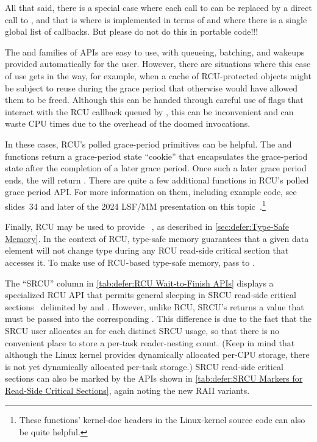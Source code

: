 {{	All that said, there is a special case where each call to
	 can be replaced by a direct call to
	, and that is where 
	is implemented in terms of  and where there is
	a single global list of callbacks.
	But please do not do this in portable code!!!
}\QuickQuizEndE
}

The  and  families of APIs are easy
to use, with queueing, batching, and wakeups provided automatically for
the user.
However, there are situations where this ease of use gets in the way,
for example, when a cache of RCU-protected objects might be subject
to reuse during the grace period that otherwise would have allowed them
to be freed.
Although this can be handed through careful use of flags that interact
with the RCU callback queued by , this can be inconvenient
and can waste CPU times due to the overhead of the doomed 
invocations.

In these cases, RCU's polled grace-period primitives can be helpful.
The  and 
functions return a grace-period state ``cookie'' that encapsulates the
grace-period state after the completion of a later grace period.
Once such a later grace period ends, the 
will return .
There are quite a few additional functions in RCU's polled grace
period API\@.
For more information on them, including example code, see slides~34 and
later of the 2024 LSF/MM presentation on this
topic~\cite{PaulEMcKenney2024ReclamationInteractionsWithRCU}.\footnote{
	These functions' kernel-doc headers in the Linux-kernel source
	code can also be quite helpful.}

Finally, RCU may be used to provide
~\cite{Cheriton96a}, as described in
\cref{sec:defer:Type-Safe Memory}.
In the context of RCU, type-safe memory guarantees that a given
data element will not change type during any RCU read-side critical section
that accesses it.
To make use of RCU-based type-safe memory, pass
 to .

The ``SRCU'' column in
\cref{tab:defer:RCU Wait-to-Finish APIs}
displays a specialized RCU API that permits general sleeping in SRCU
read-side critical
sections~\cite{PaulEMcKenney2006c}
delimited by  and .
However, unlike RCU, SRCU's  returns a value that
must be passed into the corresponding .
This difference is due to the fact that the SRCU user allocates an
 for each distinct SRCU usage, so that there is no
convenient place to store a per-task reader-nesting count.
(Keep in mind that although the Linux kernel provides dynamically
allocated per-CPU storage, there is not yet dynamically allocated
per-task storage.)
SRCU read-side critical sections can also be marked by the APIs shown in
\cref{tab:defer:SRCU Markers for Read-Side Critical Sections}, again
noting the new RAII variants.

